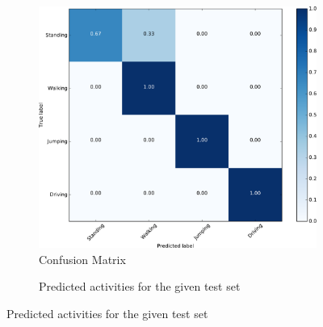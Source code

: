 \documentclass{article}
\begin{document}
\begin{figure}
		\vspace{-.5cm}
        \centering
        \begin{subfigure}[t]{0.9\linewidth}
                  \includegraphics[width=\textwidth,height=\textwidth]{figures/confusion_matrix}
                \caption{Confusion Matrix \label{fig:confusion}}
        \end{subfigure}%
        \vspace{.5cm}
		      
        \begin{subfigure}[t]{0.44\textwidth}
                \hfil
                \vspace{-1cm}
                \caption{Predicted activities for the given test set \label{fig:test_set_labels}}
                \hfill
        \end{subfigure}%
\end{figure}
\end{document}

